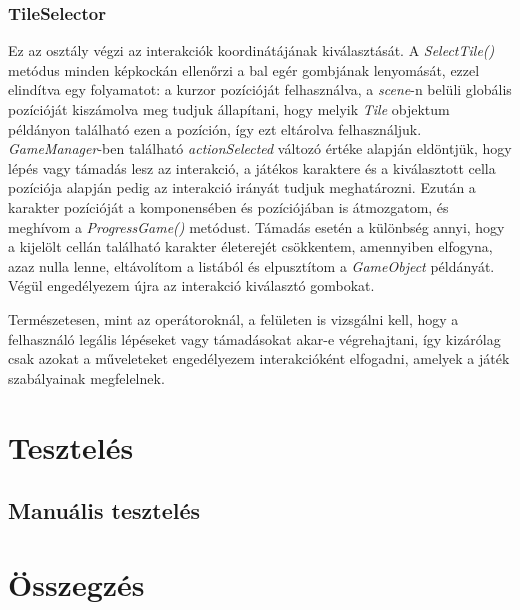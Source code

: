 \documentclass[
]{thesis-ekf}
\theoremstyle{definition}
\theoremstyle{remark}
\begin{document}
\subsection{TileSelector} \label{tileselector}

Ez az osztály végzi az interakciók koordinátájának kiválasztását. A \emph{SelectTile()} metódus minden képkockán ellenőrzi a bal egér gombjának lenyomását, ezzel elindítva egy folyamatot: a kurzor pozícióját felhasználva, a \emph{scene}-n belüli globális pozícióját kiszámolva meg tudjuk állapítani, hogy melyik \emph{Tile} objektum példányon található ezen a pozíción, így ezt eltárolva felhasználjuk. \emph{GameManager}-ben található \emph{actionSelected} változó értéke alapján eldöntjük, hogy lépés vagy támadás lesz az interakció, a játékos karaktere és a kiválasztott cella pozíciója alapján pedig az interakció irányát tudjuk meghatározni. Ezután a karakter pozícióját a komponensében és pozíciójában is átmozgatom, és meghívom a \emph{ProgressGame()} metódust. Támadás esetén a különbség annyi, hogy a kijelölt cellán található karakter életerejét csökkentem, amennyiben elfogyna, azaz nulla lenne, eltávolítom a listából és elpusztítom a \emph{GameObject} példányát. Végül engedélyezem újra az interakció kiválasztó gombokat.

Természetesen, mint az operátoroknál, a felületen is vizsgálni kell, hogy a felhasználó legális lépéseket vagy támadásokat akar-e végrehajtani, így kizárólag csak azokat a műveleteket engedélyezem interakcióként elfogadni, amelyek a játék szabályainak megfelelnek.

\chapter{Tesztelés}

\section{Manuális tesztelés}

\chapter*{Összegzés}
\end{document}
